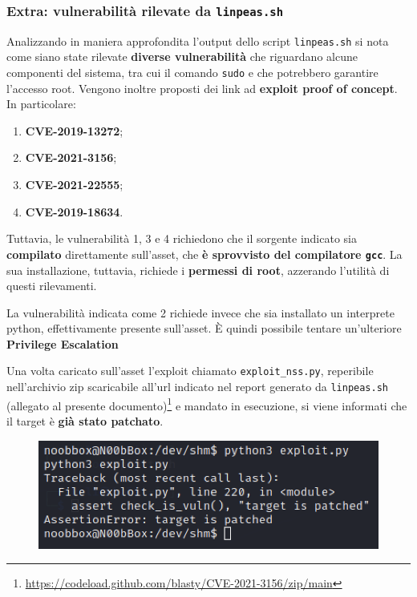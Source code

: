 \documentclass[a4paper, 12pt, oneside]{article}
\begin{document}
\subsubsection{Extra: vulnerabilità rilevate da \texttt{linpeas.sh}}
Analizzando in maniera approfondita l'output dello script \texttt{linpeas.sh} si nota come siano state rilevate \textbf{diverse vulnerabilità} che riguardano alcune componenti del sistema, tra cui il comando \texttt{sudo} e che potrebbero garantire l'accesso root. Vengono inoltre proposti dei link ad \textbf{exploit proof of concept}. In particolare:

\begin{enumerate}
    \item \textbf{CVE-2019-13272};
    \item \textbf{CVE-2021-3156};
    \item \textbf{CVE-2021-22555};
    \item \textbf{CVE-2019-18634}.
\end{enumerate}

Tuttavia, le vulnerabilità 1, 3 e 4 richiedono che il sorgente indicato sia \textbf{compilato} direttamente sull'asset, che \textbf{è sprovvisto del compilatore \texttt{gcc}}. La sua installazione, tuttavia, richiede i \textbf{permessi di root}, azzerando l'utilità di questi rilevamenti.

La vulnerabilità indicata come 2 richiede invece che sia installato un interprete python, effettivamente presente sull'asset. È quindi possibile tentare un'ulteriore \textbf{Privilege Escalation}

Una volta caricato sull'asset l'exploit chiamato \texttt{exploit\_nss.py}, reperibile nell'archivio zip scaricabile all'url indicato nel report generato da \texttt{linpeas.sh} (allegato al presente documento)\footnote{\url{https://codeload.github.com/blasty/CVE-2021-3156/zip/main}} e mandato in esecuzione, si viene informati che il target è \textbf{già stato patchato}.

\begin{figure}[h!]
    \centering
    \includegraphics[width=\textwidth]{img/patched.png}
\end{figure}
\end{document}
